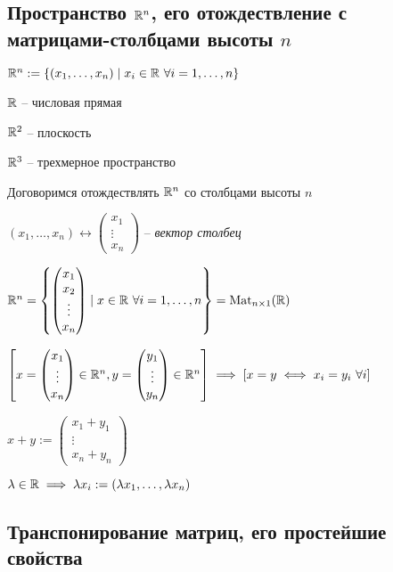 \subsection{Пространство $\mathbb{R}^n$, его отождествление с матрицами-столбцами высоты $n$}

\noindent
$\mathbb{R}^n := \{(x_1, \dots, x_n) \mid x_i \in \mathbb{R} \ \forall i = 1, \dots, n \}$

$\mathbb{R}$ -- числовая прямая

$\mathbb{R}^2$ -- плоскость

$\mathbb{R}^3$ -- трехмерное пространство

\bigskip
Договоримся отождествлять \( \mathbb{R}^n \) со столбцами высоты \( n \)

$(x_1, \dots, x_n) \leftrightarrow \begin{pmatrix} x_1 \\ \vdots \\ x_n \end{pmatrix}$ -- \textit{вектор столбец}

$\mathbb{R}^n = \left\{\begin{pmatrix} x_1 \\ x_2 \\ \vdots \\ x_n \end{pmatrix} \mid x \in \mathbb{R} \ \forall i = 1, \dots, n \right\} = \text{Mat}_{n \times 1}(\mathbb{R})$

$\left[ x = \begin{pmatrix}
    x_1 \\ \vdots \\ x_n
\end{pmatrix} \in \mathbb{R}^n, y = \begin{pmatrix}
    y_1 \\ \vdots \\ y_n
\end{pmatrix} \in \mathbb{R}^n \right] \implies 
\left[ x = y \iff x_i = y_i \ \forall i \right]$

\( x + y := \begin{pmatrix}
    x_1 + y_1 \\ \vdots \\ x_n + y_n
\end{pmatrix} \)

$\lambda \in \mathbb{R} \implies \lambda x_i := (\lambda x_1, \dots, \lambda x_n)$


\subsection{Транспонирование матриц, его простейшие свойства}

